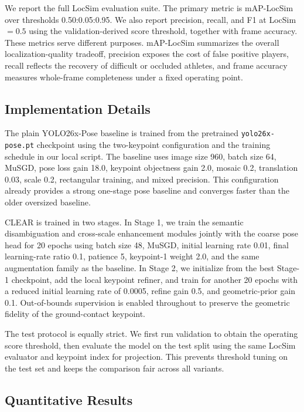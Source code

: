 \documentclass[runningheads]{llncs}
\begin{document}
We report the full LocSim evaluation suite. The primary metric is mAP-LocSim over thresholds 0.50:0.05:0.95. We also report precision, recall, and F1 at LocSim$=0.5$ using the validation-derived score threshold, together with frame accuracy. These metrics serve different purposes. mAP-LocSim summarizes the overall localization-quality tradeoff, precision exposes the cost of false positive players, recall reflects the recovery of difficult or occluded athletes, and frame accuracy measures whole-frame completeness under a fixed operating point.

\subsection{Implementation Details}
\label{sec:implementation}

The plain YOLO26x-Pose baseline is trained from the pretrained \texttt{yolo26x-pose.pt} checkpoint using the two-keypoint configuration and the training schedule in our local script. The baseline uses image size 960, batch size 64, MuSGD, pose loss gain 18.0, keypoint objectness gain 2.0, mosaic 0.2, translation 0.03, scale 0.2, rectangular training, and mixed precision. This configuration already provides a strong one-stage pose baseline and converges faster than the older oversized baseline.

CLEAR is trained in two stages. In Stage 1, we train the semantic disambiguation and cross-scale enhancement modules jointly with the coarse pose head for 20 epochs using batch size 48, MuSGD, initial learning rate 0.01, final learning-rate ratio 0.1, patience 5, keypoint-1 weight 2.0, and the same augmentation family as the baseline. In Stage 2, we initialize from the best Stage-1 checkpoint, add the local keypoint refiner, and train for another 20 epochs with a reduced initial learning rate of 0.0005, refine gain 0.5, and geometric-prior gain 0.1. Out-of-bounds supervision is enabled throughout to preserve the geometric fidelity of the ground-contact keypoint.

The test protocol is equally strict. We first run validation to obtain the operating score threshold, then evaluate the model on the test split using the same LocSim evaluator and keypoint index for projection. This prevents threshold tuning on the test set and keeps the comparison fair across all variants.

\subsection{Quantitative Results}
\label{sec:quantitative}
\end{document}
